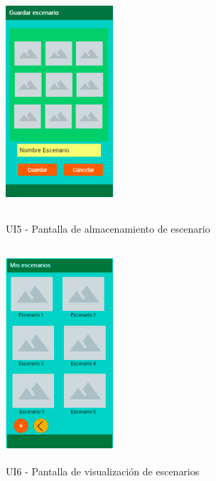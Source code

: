 \begin{figure}[h!]
	\begin{minipage}{0.48\textwidth}
		\centering
		\includegraphics[width=4cm,height=8cm]{imagenes/Anexos/Mockup/5-GuardarEscenario.png}
		\caption{UI5 - Pantalla de almacenamiento de escenario}
		\label{fig:analogo}
	\end{minipage}\hfill
	\begin{minipage}{0.48\textwidth}
		\centering
		\includegraphics[width=4cm,height=8cm]{imagenes/Anexos/Mockup/6-MisEscenarios.png}
		\caption{UI6 - Pantalla de visualización de escenarios }
		\label{fig:analogo}
	\end{minipage}\hfill
\end{figure}

